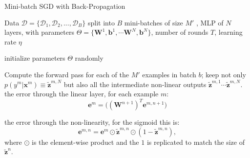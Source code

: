 \begin{algorithm}[th!]

   \caption{Mini-batch SGD with Back-Propagation}

\begin{algorithmic}[1]
\label{algo:backprop}

Data $\mathcal{D}=\{\mathcal{D}_1,\mathcal{D}_2,...,\mathcal{D}_B\}$ split into $B$ mini-batches of size $M'$%
, MLP of $N$ layers, with parameters $\Theta=\{\mathbf{W}^1, \mathbf{b}^1, \cdots \mathbf{W}^N, \mathbf{b}^N\}$, number of rounds $T$, learning rate $\eta$

   \STATE initialize parameters $\Theta$ randomly


	\vspace{0.3cm}
	\STATE Compute the {forward pass} for each of the $M'$ examples in batch $b$;
	 keep not only $p(y^m|\mathbf{x}^m) \equiv \tilde{\mathbf{z}}^{m,N}$ but also all the intermediate non-linear outputs $\tilde{\mathbf{z}}^{m,1} \cdots \tilde{\mathbf{z}}^{m,N}$.
	\ENDFOR	
	\vspace{0.3cm}
		\ENDFOR	
        \ELSE
		 the error through the linear layer, for each example $m$:
        $$\mathbf{e}^{m} = \Big((\mathbf{W}^{n+1})^T \mathbf{e}^{m,n+1}\Big)$$

		 the error through the non-linearity, for the sigmoid this is:
        $$\mathbf{e}^{m,n} = \mathbf{e}^{m} \odot \tilde{\mathbf{z}}^{m,n} \odot (\mathbf{\mathrm{1}}-\tilde{\mathbf{z}}^{m,n}),$$
        where $\odot$ is the element-wise product and the $\mathbf{\mathrm{1}}$ is replicated to match the size of $\tilde{\mathbf{z}}^n$.


\end{algorithmic}
\end{algorithm}
